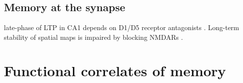 


\subsection{Memory at the synapse}
\citep{Tsien1996}\citep{McHugh1996}\citep{Dragoi2013}\citep[reviewed in,][]{Nakazawa2004}
late-phase of LTP in CA1 depends on D1/D5 receptor antagonists \citep{Huang1995}.
Long-term stability of spatial maps is impaired by blocking NMDARs \citep{Kentros1998}.

\section{Functional correlates of memory}\label{sec:intro:memory:physiology}


